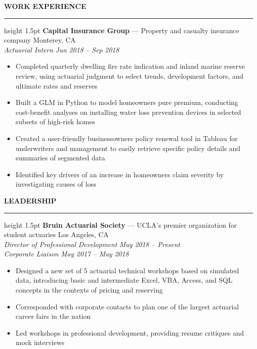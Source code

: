 \documentclass[11pt,letterpaper]{article}
\newcommand{\sectline}{\vspace{4pt}\hrule height 1.5pt\vspace{4pt}}
\newcommand{\sectspace}{\vspace{8pt}}
\newcommand{\smallspace}{\vspace{4pt}}
\begin{document}
\textbf{WORK EXPERIENCE}\sectline
\textbf{Capital Insurance Group} --- Property and casualty insurance company \hfill Monterey, CA \\
\textit{Actuarial Intern} \hfill \textit{Jun 2018 -- Sep 2018 }
\begin{itemize}
	\item Completed quarterly dwelling fire rate indication and inland marine reserve review, using actuarial judgment to select trends, development factors, and ultimate rates and reserves
	\item Built a GLM in Python to model homeowners pure premium, conducting cost-benefit analyses on installing water loss prevention devices in selected subsets of high-risk homes 
	\item Created a user-friendly businessowners policy renewal tool in Tableau for underwriters and management to easily retrieve specific policy details and summaries of segmented data
	\item Identified key drivers of an increase in homeowners claim severity by investigating causes of loss
\end{itemize}
\sectspace


\textbf{LEADERSHIP} \sectline
\textbf{Bruin Actuarial Society} --- UCLA's premier organization for student actuaries \hfill Los Angeles, CA \\
\textit{Director of Professional Development} \hfill \textit{May 2018 -- Present} \\
\textit{Corporate Liaison} \hfill \textit{May 2017 -- May 2018}
\begin{itemize}
	\item Designed a new set of 5 actuarial technical workshops based on simulated data, introducing basic and intermediate Excel, VBA, Access, and SQL concepts in the contexts of pricing and reserving
	\item Corresponded with corporate contacts to plan one of the largest actuarial career fairs in the nation
	\item Led workshops in professional development, providing resume critiques and mock interviews
\end{itemize}
\sectspace
\end{document}
